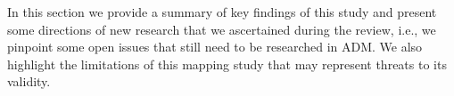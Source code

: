 In this section we provide a summary of key findings of this study and present some directions of new research that we ascertained during the review, i.e., we pinpoint some open issues that still need to be researched in ADM. We also highlight the limitations of this mapping study that may represent threats to its validity.

